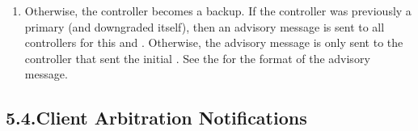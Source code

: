 \documentclass[11pt]{article}
\begin{document}
{\begin{enumerate}
\begin{enumerate}
\begin{enumerate}
\item{}
The server now accepts the current controller as the new primary,
thus accepting  requests from this controller. The server
updates the highest election ID (i.e. ) it has seen
for this  and  to .%

\item{}
The server notifies the new primary by sending the advisory message
described in the~.%
\end{enumerate}%
\end{enumerate}%

\item{}
Otherwise, the controller becomes a backup. If the controller was previously
a primary (and downgraded itself), then an advisory message is sent to all
controllers for this  and .  Otherwise, the advisory
message is only sent to the controller that sent the initial
.  See the
 for the format of the
advisory message.%
\end{enumerate}%

\subsection{5.4.\hspace*{0.5em}Client Arbitration Notifications}\label{sec-arbitration-notification}%

}
\end{document}

